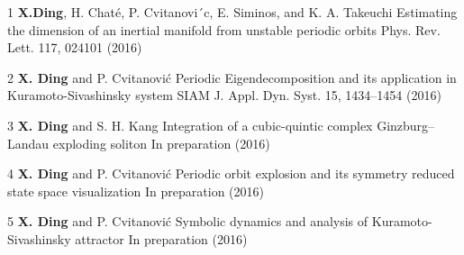 



\begin{cvpub}

  \cvpubentry
  {1}
  {\textbf{X.Ding},  H. Chaté, P. Cvitanovi´c, E. Siminos, and K. A. Takeuchi}
  {Estimating the dimension of an inertial manifold from unstable periodic orbits}
  {Phys. Rev. Lett. 117, 024101 (2016)}

  \cvpubentry
  {2}
  {\textbf{X. Ding} and P. Cvitanovi\'c}
  {Periodic Eigendecomposition and its application in Kuramoto-Sivashinsky system}
  {SIAM J. Appl. Dyn. Syst. 15, 1434–1454 (2016)}

  \cvpubentry
  {3}
  {\textbf{X. Ding} and S. H. Kang}
  {Integration of a cubic-quintic complex {Ginzburg--Landau} exploding soliton}
  {In preparation (2016)}

  \cvpubentry
  {4}
  {\textbf{X. Ding} and P. Cvitanovi\'c}
  {Periodic orbit explosion and its symmetry reduced state space visualization}
  {In preparation (2016)}

  \cvpubentry
  {5}
  {\textbf{X. Ding} and P. Cvitanovi\'c}
  {Symbolic dynamics and analysis of Kuramoto-Sivashinsky attractor}
  {In preparation (2016)}

\end{cvpub}
